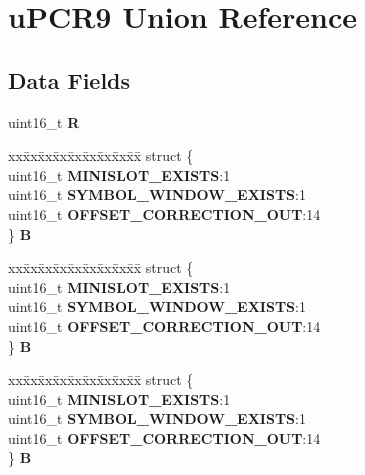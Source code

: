 \hypertarget{unionuPCR9}{}\section{u\+P\+C\+R9 Union Reference}
\label{unionuPCR9}
\subsection*{Data Fields}
\begin{DoxyCompactItemize}
\item 
\mbox{\label{unionuPCR9_a2588a5cfc2bfd0884695d6b376006e4c}} 
uint16\+\_\+t {\bfseries R}
\item 
\mbox{\label{unionuPCR9_a1913c2124b1300f5913c8cda5992897e}} 
\begin{tabbing}
xx\=xx\=xx\=xx\=xx\=xx\=xx\=xx\=xx\=\kill
struct \{\\
\>uint16\_t {\bfseries MINISLOT\_EXISTS}:1\\
\>uint16\_t {\bfseries SYMBOL\_WINDOW\_EXISTS}:1\\
\>uint16\_t {\bfseries OFFSET\_CORRECTION\_OUT}:14\\
\} {\bfseries B}\\

\end{tabbing}\item 
\mbox{\label{unionuPCR9_aded90c3dd16507d5ea906578774ad9ce}} 
\begin{tabbing}
xx\=xx\=xx\=xx\=xx\=xx\=xx\=xx\=xx\=\kill
struct \{\\
\>uint16\_t {\bfseries MINISLOT\_EXISTS}:1\\
\>uint16\_t {\bfseries SYMBOL\_WINDOW\_EXISTS}:1\\
\>uint16\_t {\bfseries OFFSET\_CORRECTION\_OUT}:14\\
\} {\bfseries B}\\

\end{tabbing}\item 
\mbox{\label{unionuPCR9_a39718f6fefc0cd5a45bf5cebfcce3cfd}} 
\begin{tabbing}
xx\=xx\=xx\=xx\=xx\=xx\=xx\=xx\=xx\=\kill
struct \{\\
\>uint16\_t {\bfseries MINISLOT\_EXISTS}:1\\
\>uint16\_t {\bfseries SYMBOL\_WINDOW\_EXISTS}:1\\
\>uint16\_t {\bfseries OFFSET\_CORRECTION\_OUT}:14\\
\} {\bfseries B}\\


\end{tabbing}
\end{DoxyCompactItemize}
